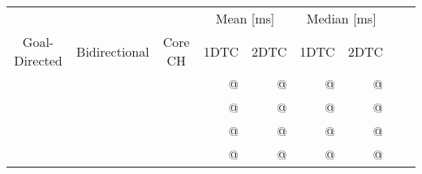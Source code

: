 \begin{tabular}{cccrrrrrr}
	\toprule
	              &               &         & \multicolumn{2}{c}{Mean [\si{\milli\second}]} & \multicolumn{2}{c}{Median [\si{\milli\second}]}               \\
	Goal-Directed & Bidirectional & Core CH & 1DTC                                          & 2DTC                                            & 1DTC & 2DTC \\
	\midrule
	\cmark        & \xmark        & \xmark  & @                                             & @                                               & @    & @    \\
	\cmark        & \cmark        & \xmark  & @                                             & @                                               & @    & @    \\
	\xmark        & \cmark        & \cmark  & @                                             & @                                               & @    & @    \\
	\cmark        & \cmark        & \cmark  & @                                             & @                                               & @    & @    \\
	\bottomrule
\end{tabular}